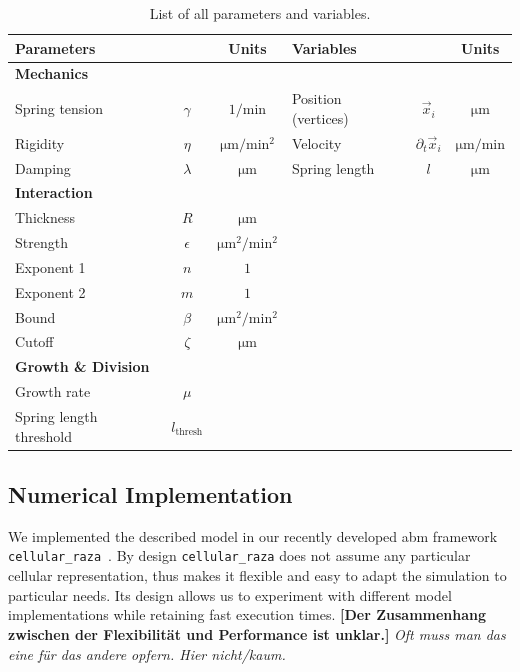 \documentclass{article}
\begin{document}
\begin{table}[H]
    \centering
    \def\arraystretch{1.3}
    \begin{tabular}{l c c l c c}
        \textbf{Parameters} && \textbf{Units} & \textbf{Variables} && \textbf{Units}\\
        \toprule
        \multicolumn{4}{l}{\textbf{Mechanics}}\\
        \midrule
        Spring tension & $\gamma$ & $\unit{1\per\minute}$ & Position (vertices) & $\vec{x}_i$ & $\unit{\micro\metre}$\\
        Rigidity & $\eta$ & $\unit{\micro\metre\per\minute^2}$ & Velocity & $\partial_t\vec{x}_i$ & $\unit{\micro\metre\per\minute}$\\
        Damping & $\lambda$ & $\unit{\micro\metre}$ & Spring length & $l$ & $\unit{\micro\metre}$\\
        \multicolumn{4}{l}{\textbf{Interaction}}\\
        \midrule
        Thickness & $R$ & $\unit{\micro\metre}$\\
        Strength & $\epsilon$ & $\unit{\micro\metre^2\per\minute^2}$\\
        Exponent 1 & $n$ & $1$\\
        Exponent 2 & $m$ & $1$\\
        Bound & $\beta$ & $\unit{\micro\metre^2\per\minute^2}$\\
        Cutoff & $\zeta$ & $\unit{\micro\metre}$\\
        \multicolumn{4}{l}{\textbf{Growth \& Division}}\\
        \midrule
        Growth rate & $\mu$\\
        Spring length threshold & $l_\text{thresh}$\\
        \bottomrule
    \end{tabular}
    \caption{
        List of all parameters and variables.
    }
    \label{table:list-of-parameters}
\end{table}

\subsection{Numerical Implementation}

We implemented the described model in our recently developed \ac{abm} framework
\texttt{cellular\_raza}~\cite{Pleyer2025}.
By design \texttt{cellular\_raza} does not assume any particular cellular representation, thus makes
it flexible and easy to adapt the simulation to particular needs.
Its design allows us to experiment with different model implementations while retaining fast
execution times.
\textbf{[Der Zusammenhang zwischen der Flexibilität und Performance ist unklar.]}
\textit{Oft muss man das eine für das andere opfern. Hier nicht/kaum.}
\end{document}
